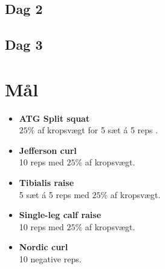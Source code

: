 \documentclass[11pt]{article}
\begin{document}
\subsection*{Dag 2}
\subsection*{Dag 3}
\newpage
\section*{Mål}
\begin{itemize}
\item \textbf{ATG Split squat} \\ $25\%$ af kropsvægt for 5 sæt á 5 reps .
\item \textbf{Jefferson curl} \\ 10 reps med $25\%$ af kropsvægt.
\item \textbf{Tibialis raise} \\ 5 sæt á 5 reps med $25\%$ af kropsvægt.
\item \textbf{Single-leg calf raise} \\ 10 reps med $25\%$ af kropsvægt.
\item \textbf{Nordic curl} \\ 10 negative reps.
\end{itemize}
\end{document}
